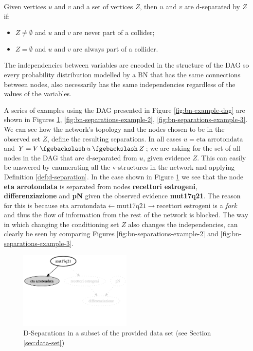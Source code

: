 \begin{definition}[D-Separation] \label{def:d-separation}
	Given vertices $u$ and $v$ and a set of vertices $Z$, then $u$ and $v$ are d-separated by $Z$ if:
	\begin{itemize}
		\item $Z \neq \emptyset$ and $u$ and $v$ are never part of a collider;
		\item $Z = \emptyset$ and $u$ and $v$ are always part of a collider.
	\end{itemize}
\end{definition}

The independencies between variables are encoded in the structure of the DAG so every probability distribution modelled by a BN that has the same connections between nodes, also necessarily has the same independencies regardless of the values of the variables.

A series of examples using the DAG presented in Figure \ref{fig:bn-example-dag} are shown in Figures \ref{fig:bn-separations-example-1}, \ref{fig:bn-separations-example-2}, \ref{fig:bn-separations-example-3}.
We can see how the network's topology and the nodes chosen to be in the observed set $Z$, define the resulting separations.
In all cases $u=  \text{eta arrotondata} $ and $Y=V \mysetminus u \mysetminus Z$; we are asking for the set of all nodes in the DAG that are d-separated from $u$, given evidence $Z$.
This can easily be answered by enumerating all the v-structures in the network and applying Definition \ref{def:d-separation}.
In the case shown in Figure \ref{fig:bn-separations-example-1} we see that the node \textbf{eta arrotondata} is separated from nodes \textbf{recettori estrogeni}, \textbf{differenziazione} and \textbf{pN} given the observed evidence \textbf{mut17q21}.
The reason for this is because \textbf{$\text{eta arrotondata} \leftarrow \text{mut17q21} \rightarrow \text{recettori estrogeni}$} is a \textit{fork} and thus the flow of information from the rest of the network is blocked.
The way in which changing the conditioning set $Z$ also changes the independencies, can clearly be seen by comparing Figures \ref{fig:bn-separations-example-2} and \ref{fig:bn-separations-example-3}.

\begin{figure}[htbp]
\centerline{\includegraphics[width=0.5\textwidth]{mathematical-background/images/bn-example-separations-1}}
\caption{D-Separations in a subset of the provided data set (see Section \ref{sec:data-set})}
\label{fig:bn-separations-example-1}
\end{figure}

